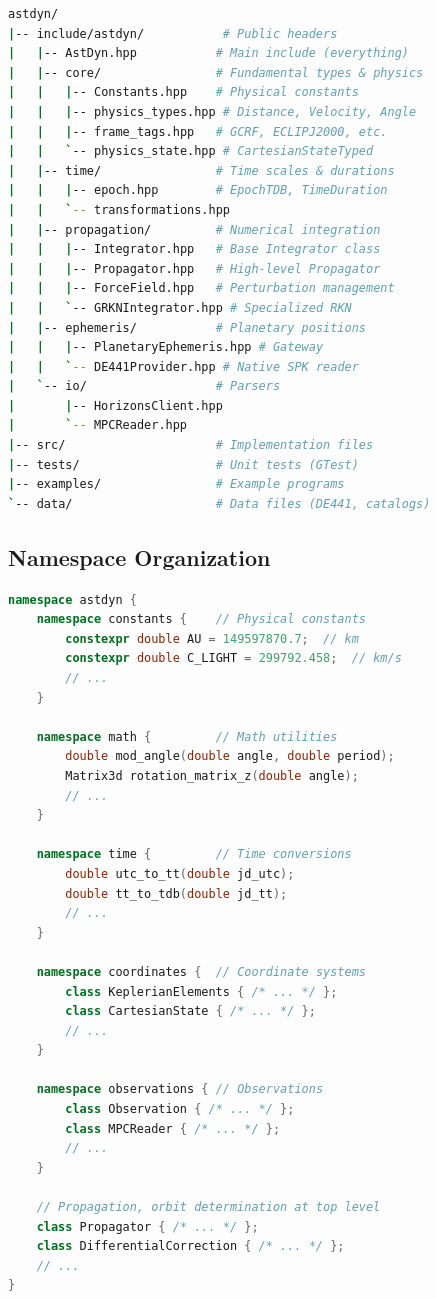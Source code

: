 \begin{lstlisting}[language=bash,caption={Project layout}]
astdyn/
|-- include/astdyn/           # Public headers
|   |-- AstDyn.hpp           # Main include (everything)
|   |-- core/                # Fundamental types & physics
|   |   |-- Constants.hpp    # Physical constants
|   |   |-- physics_types.hpp # Distance, Velocity, Angle
|   |   |-- frame_tags.hpp   # GCRF, ECLIPJ2000, etc.
|   |   `-- physics_state.hpp # CartesianStateTyped
|   |-- time/                # Time scales & durations
|   |   |-- epoch.hpp        # EpochTDB, TimeDuration
|   |   `-- transformations.hpp
|   |-- propagation/         # Numerical integration
|   |   |-- Integrator.hpp   # Base Integrator class
|   |   |-- Propagator.hpp   # High-level Propagator
|   |   |-- ForceField.hpp   # Perturbation management
|   |   `-- GRKNIntegrator.hpp # Specialized RKN
|   |-- ephemeris/           # Planetary positions
|   |   |-- PlanetaryEphemeris.hpp # Gateway
|   |   `-- DE441Provider.hpp # Native SPK reader
|   `-- io/                  # Parsers
|       |-- HorizonsClient.hpp
|       `-- MPCReader.hpp
|-- src/                     # Implementation files
|-- tests/                   # Unit tests (GTest)
|-- examples/                # Example programs
`-- data/                    # Data files (DE441, catalogs)
\end{lstlisting}

\subsection{Namespace Organization}

\begin{lstlisting}[language=C++,caption={Namespace hierarchy}]
namespace astdyn {
    namespace constants {    // Physical constants
        constexpr double AU = 149597870.7;  // km
        constexpr double C_LIGHT = 299792.458;  // km/s
        // ...
    }
    
    namespace math {         // Math utilities
        double mod_angle(double angle, double period);
        Matrix3d rotation_matrix_z(double angle);
        // ...
    }
    
    namespace time {         // Time conversions
        double utc_to_tt(double jd_utc);
        double tt_to_tdb(double jd_tt);
        // ...
    }
    
    namespace coordinates {  // Coordinate systems
        class KeplerianElements { /* ... */ };
        class CartesianState { /* ... */ };
        // ...
    }
    
    namespace observations { // Observations
        class Observation { /* ... */ };
        class MPCReader { /* ... */ };
        // ...
    }
    
    // Propagation, orbit determination at top level
    class Propagator { /* ... */ };
    class DifferentialCorrection { /* ... */ };
    // ...
}
\end{lstlisting}

